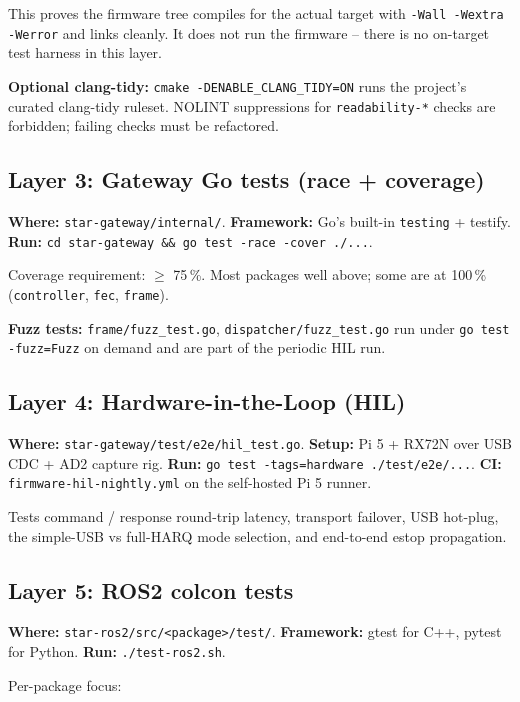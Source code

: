 This proves the firmware tree compiles for the actual target with
\texttt{-Wall -Wextra -Werror} and links cleanly. It does not run
the firmware -- there is no on-target test harness in this layer.

\textbf{Optional clang-tidy:} \texttt{cmake -DENABLE\_CLANG\_TIDY=ON}
runs the project's curated clang-tidy ruleset. NOLINT suppressions
for \texttt{readability-*} checks are forbidden; failing checks
must be refactored.

\subsection{Layer 3: Gateway Go tests (race + coverage)}

\textbf{Where:} \texttt{star-gateway/internal/}.
\textbf{Framework:} Go's built-in \texttt{testing} + testify.
\textbf{Run:} \texttt{cd star-gateway \&\& go test -race -cover ./...}.

Coverage requirement: $\ge$ 75\,\%. Most packages well above; some
are at 100\,\% (\texttt{controller}, \texttt{fec}, \texttt{frame}).

\textbf{Fuzz tests:} \texttt{frame/fuzz\_test.go},
\texttt{dispatcher/fuzz\_test.go} run under \texttt{go test -fuzz=Fuzz}
on demand and are part of the periodic HIL run.

\subsection{Layer 4: Hardware-in-the-Loop (HIL)}

\textbf{Where:} \texttt{star-gateway/test/e2e/hil\_test.go}.
\textbf{Setup:} Pi 5 + RX72N over USB CDC + AD2 capture rig.
\textbf{Run:} \texttt{go test -tags=hardware ./test/e2e/...}.
\textbf{CI:} \texttt{firmware-hil-nightly.yml} on the self-hosted
Pi 5 runner.

Tests command / response round-trip latency, transport failover,
USB hot-plug, the simple-USB vs full-HARQ mode selection, and
end-to-end estop propagation.

\subsection{Layer 5: ROS2 colcon tests}

\textbf{Where:} \texttt{star-ros2/src/<package>/test/}.
\textbf{Framework:} gtest for C++, pytest for Python.
\textbf{Run:} \texttt{./test-ros2.sh}.

Per-package focus:


